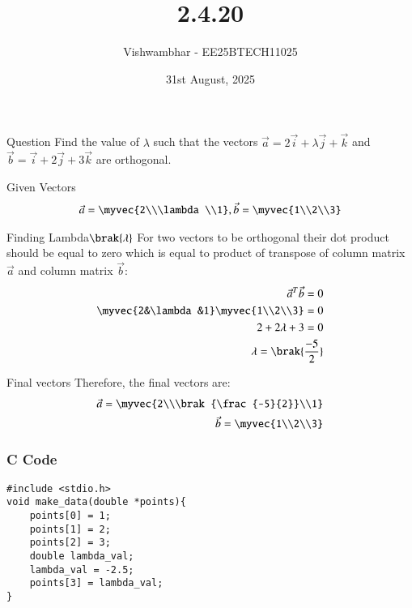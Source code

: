 \documentclass{beamer}
\title{2.4.20}
\date{31st August, 2025}
\author{Vishwambhar - EE25BTECH11025}
\begin{document}
\frame{\titlepage}
\begin{frame}{Question}
Find the value of $\lambda$ such that the vectors $\vec{a}=2\vec{i}+\lambda\vec{j}+\vec{k}$ and $\vec{b}=\vec{i}+2\vec{j}+3\vec{k}$ are orthogonal.
\end{frame}

\begin{frame}{Given Vectors}
\begin{align}
    \vec{a}=\myvec{2\\\lambda\\1},
    \vec{b}=\myvec{1\\2\\3}
\end{align}
\end{frame}

\begin{frame}{Finding Lambda$\brak{\lambda}$}
For two vectors to be orthogonal their dot product should be equal to zero which is equal to product of transpose of column matrix $\vec{a}$ and column matrix $\vec{b}$:
\begin{align}
    \vec{a}^T\vec{b}=0\\
    \myvec{2&\lambda&1}\myvec{1\\2\\3}=0\\
    2+2\lambda+3=0\\
    \lambda=\brak{\frac{-5}{2}}
\end{align}
\end{frame}

\begin{frame}{Final vectors}
    Therefore, the final vectors are:
\begin{align}
    \vec{a}=\myvec{2\\\brak{\frac{-5}{2}}\\1}\\
    \vec{b}=\myvec{1\\2\\3}
\end{align}
\end{frame}

\begin{frame}[fragile]
    \frametitle{C Code}
    \begin{lstlisting}
#include <stdio.h>
void make_data(double *points){
    points[0] = 1;
    points[1] = 2;
    points[2] = 3;
    double lambda_val;
    lambda_val = -2.5;
    points[3] = lambda_val;
}
    \end{lstlisting}
\end{frame}
\end{document}
